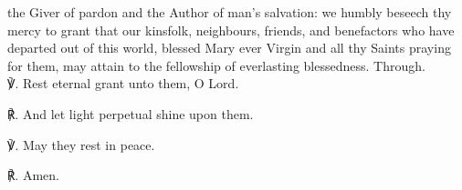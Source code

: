 \begin{multicols}{2}
{} the Giver of pardon and the Author of man's salvation: we humbly beseech thy mercy to grant that our kinsfolk, neighbours, friends, and benefactors who have departed out of this world, blessed Mary ever Virgin and all thy Saints praying for them, may attain to the fellowship of everlasting blessedness. Through.\\

℣. Rest eternal grant unto them, O Lord.\par
℟. And let light perpetual shine upon them.\par
℣. May they rest in peace.\par
℟. Amen.
\end{multicols}